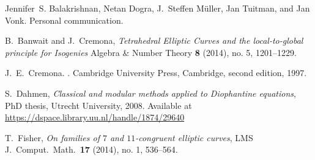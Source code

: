 \documentclass[12pt]{amsart}
\newcommand{\calL}{\mathcal{L}}
\newcommand{\calM}{\mathcal{M}}
\numberwithin{equation}{section}
\theoremstyle{definition}
\theoremstyle{remark}
\begin{document}



 
\begin{thebibliography}{999}


Jennifer~S. Balakrishnan, Netan Dogra, J.~Steffen M\"uller, Jan Tuitman, and
  Jan Vonk.
\newblock Personal communication.

 B.\ Banwait and J.\ Cremona, 
{\em Tetrahedral Elliptic Curves and the local-to-global principle for Isogenies}
Algebra \& Number Theory {\bf 8} (2014), no. 5, 1201--1229.

  

J.~E.~Cremona.
.
\newblock Cambridge University Press, Cambridge, second edition, 1997.

 S.\ Dahmen,
 {\em Classical and modular methods applied to Diophantine equations}, 
 PhD thesis, Utrecht University, 2008. Available at \\
 \url{https://dspace.library.uu.nl/handle/1874/29640}

 T.\ Fisher,
{\em On families of $7$ and $11$-congruent elliptic curves}, 
LMS J.\ Comput.\ Math.\ {\bf 17} (2014), no. 1, 536--564.


\end{thebibliography}
\end{document}
